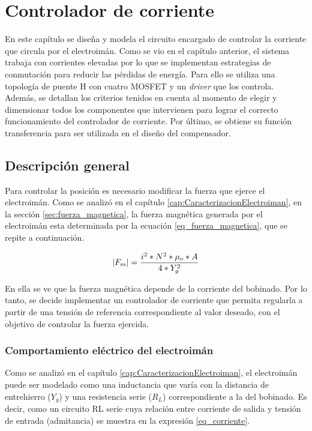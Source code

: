 \chapter{Controlador de corriente}  \label{cap:ControladorCorriente}

En este capítulo se diseña y modela el circuito encargado de controlar la corriente que circula por el electroimán. Como se vio en el capítulo anterior, el sistema trabaja con corrientes elevadas por lo que se implementan estrategias de conmutación para reducir las pérdidas de energía. Para ello se utiliza una topología de puente H con cuatro MOSFET y un \textsl{driver} que los controla. Además, se detallan los criterios tenidos en cuenta al momento de  elegir  y dimensionar todos los componentes que intervienen para lograr el correcto funcionamiento del controlador de corriente. Por último, se obtiene su función transferencia  para ser utilizada en el diseño del compensador.

\section{Descripción general}\label{sec_descripcion-general}

Para controlar la posición es necesario modificar la fuerza que ejerce el electroimán. Como se analizó en el capítulo \ref{cap:CaracterizacionElectroiman}, en la sección \ref{sec:fuerza_magnetica}, la fuerza magnética generada por el electroimán esta determinada por la ecuación \ref{eq_fuerza_magnetica}, que se repite a continuación. 

\begin{equation*}
	\lvert F_{m}\rvert=\frac{i^{2}*N^{2}*\mu_{o}*A}{4*Y_{g}^{2}}
\end{equation*}

En ella se ve que la fuerza magnética depende de la corriente del bobinado. Por lo tanto, se decide implementar un controlador de corriente que permita regularla a partir de una tensión de referencia correspondiente al valor deseado, con el objetivo de controlar la fuerza ejercida.

\subsection{Comportamiento eléctrico del electroimán}\label{sec_comportamiento-electrico-electroiman}

Como se analizó en el capítulo \ref{cap:CaracterizacionElectroiman}, el electroimán puede ser modelado como una inductancia que varía con la distancia de entrehierro ($Y_g$) y una resistencia serie ($R_L$) correspondiente a la del bobinado. Es decir, como un circuito RL serie cuya relación entre corriente de salida y tensión de entrada (admitancia) se muestra en la expresión \ref{eq_corriente}.

